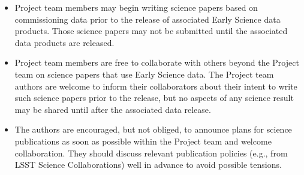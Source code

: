 \documentclass[SE,authoryear,toc,lsstdraft]{lsstdoc}
\begin{document}
\begin{itemize}

  \item Project team members may begin writing science papers based on commissioning data prior to the release of associated Early Science data products.
  Those science papers may not be submitted until the associated data products are released.

  \item Project team members are free to collaborate with others beyond the Project team on science papers that use Early Science data.
  The Project team authors are welcome to inform their collaborators about their intent to write such science papers prior to the release, but no aspects of any science result may be shared until after the associated data release.

  \item The authors are encouraged, but not obliged, to announce plans for science publications as soon as possible within the Project team and welcome collaboration.
  They should discuss relevant publication policies (e.g., from LSST Science Collaborations) well in advance to avoid possible tensions.






\end{itemize}
\end{document}
